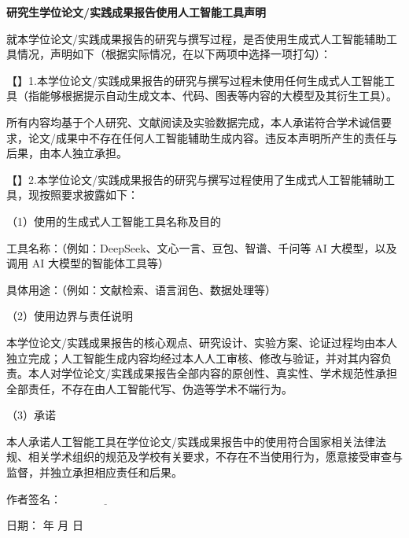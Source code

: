 \newpage
\pagestyle{empty}

\begin{center}
  {\fontsize{16pt}{24pt}\selectfont\songti\bfseries 研究生学位论文/实践成果报告使用人工智能工具声明}
\end{center}

\vskip 1cm

\normalsize \indent
就本学位论文/实践成果报告的研究与撰写过程，是否使用生成式人工智能辅助工具情况，声明如下（根据实际情况，在以下两项中选择一项打勾）：

\vskip 0.5cm

\noindent【\quad】1.本学位论文/实践成果报告的研究与撰写过程未使用任何生成式人工智能工具（指能够根据提示自动生成文本、代码、图表等内容的大模型及其衍生工具）。

\noindent 所有内容均基于个人研究、文献阅读及实验数据完成，本人承诺符合学术诚信要求，论文/成果中不存在任何人工智能辅助生成内容。违反本声明所产生的责任与后果，由本人独立承担。

\vskip 0.5cm

\noindent【\quad】2.本学位论文/实践成果报告的研究与撰写过程使用了生成式人工智能辅助工具，现按照要求披露如下：

\vskip 0.3cm

\noindent（1）使用的生成式人工智能工具名称及目的

\noindent 工具名称：\underline{\hspace{6cm}}（例如：DeepSeek、文心一言、豆包、智谱、千问等 AI 大模型，以及调用 AI 大模型的智能体工具等）

\noindent 具体用途：\underline{\hspace{6cm}}（例如：文献检索、语言润色、数据处理等）

\vskip 0.3cm

\noindent（2）使用边界与责任说明

\noindent 本学位论文/实践成果报告的核心观点、研究设计、实验方案、论证过程均由本人独立完成；人工智能生成内容均经过本人人工审核、修改与验证，并对其内容负责。本人对学位论文/实践成果报告全部内容的原创性、真实性、学术规范性承担全部责任，不存在由人工智能代写、伪造等学术不端行为。

\vskip 0.3cm

\noindent（3）承诺

\noindent 本人承诺人工智能工具在学位论文/实践成果报告中的使用符合国家相关法律法规、相关学术组织的规范及学校有关要求，不存在不当使用行为，愿意接受审查与监督，并独立承担相应责任和后果。

\vfill

\begin{flushright}
{作者签名}：$\underline{\qquad\qquad\qquad\qquad}$\quad

\vskip 0.5cm

{日\qquad 期}：\underline{\qquad\qquad} 年 \underline{\quad} 月 \underline{\quad} 日\quad
\end{flushright}
